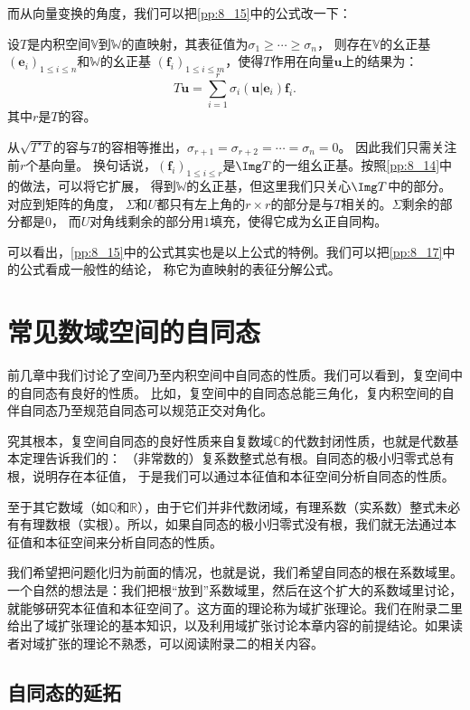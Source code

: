 \documentclass[12pt,UTF8,fontset=none]{ctexbook}
\begin{document}
而从向量变换的角度，我们可以把\ref{pp:8_15}中的公式改一下：
\begin{pp}\label{pp:8_17}
    设$T$是内积空间$\mathbb{V}$到$\mathbb{W}$的直映射，其表征值为$\sigma_1 \geqslant \cdots \geqslant \sigma_n$，
    则存在$\mathbb{V}$的幺正基$(\mathbf{e}_i)_{1\leqslant i \leqslant n}$和$\mathbb{W}$的幺正基
    $(\mathbf{f}_i)_{1\leqslant i \leqslant m}$，使得$T$作用在向量$\mathbf{u}$上的结果为：
    $$ T\mathbf{u} = \sum_{i=1}^r \sigma_i (\mathbf{u} | \mathbf{e}_i) \mathbf{f}_i.$$
    其中$r$是$T$的容。
\end{pp}
从$\sqrt{T^\star T}$的容与$T$的容相等推出，$\sigma_{r+1} = \sigma_{r+2} = \cdots = \sigma_{n} = 0$。
因此我们只需关注前$r$个基向量。
换句话说，$(\mathbf{f}_i)_{1\leqslant i \leqslant r}$是$\Img T$的一组幺正基。按照\ref{pp:8_14}中的做法，可以将它扩展，
得到$\mathbb{W}$的幺正基，但这里我们只关心$\Img T$中的部分。对应到矩阵的角度，
$\Sigma$和$U$都只有左上角的$r\times r$的部分是与$T$相关的。$\Sigma$剩余的部分都是$0$，
而$U$对角线剩余的部分用$1$填充，使得它成为幺正自同构。

可以看出，\ref{pp:8_15}中的公式其实也是以上公式的特例。我们可以把\ref{pp:8_17}中的公式看成一般性的结论，
称它为直映射的表征分解公式。

\chapter{常见数域空间的自同态}
前几章中我们讨论了空间乃至内积空间中自同态的性质。我们可以看到，复空间中的自同态有良好的性质。
比如，复空间中的自同态总能三角化，复内积空间的自伴自同态乃至规范自同态可以规范正交对角化。

究其根本，复空间自同态的良好性质来自复数域$\mathbb{C}$的代数封闭性质，也就是代数基本定理告诉我们的：
（非常数的）复系数整式总有根。自同态的极小归零式总有根，说明存在本征值，
于是我们可以通过本征值和本征空间分析自同态的性质。

至于其它数域（如$\mathbb{Q}$和$\mathbb{R}$），由于它们并非代数闭域，有理系数（实系数）整式未必有有理数根（实根）。所以，如果自同态的极小归零式没有根，我们就无法通过本征值和本征空间来分析自同态的性质。

我们希望把问题化归为前面的情况，也就是说，我们希望自同态的根在系数域里。一个自然的想法是：我们把根“放到”系数域里，然后在这个扩大的系数域里讨论，就能够研究本征值和本征空间了。这方面的理论称为域扩张理论。我们在附录二里给出了域扩张理论的基本知识，以及利用域扩张讨论本章内容的前提结论。如果读者对域扩张的理论不熟悉，可以阅读附录二的相关内容。

\section{自同态的延拓}
\end{document}
